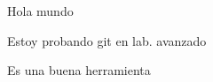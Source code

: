\documentclass{article}
\begin{document}
Hola mundo

Estoy probando git en lab. avanzado

Es una buena herramienta
\end{document}
